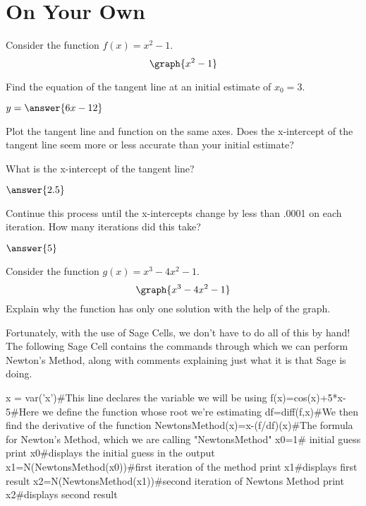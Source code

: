 \documentclass{ximera}
\begin{document}
\section{On Your Own}
\begin{question}
Consider the function $f(x) = x^2-1$.
\[
\graph{x^2-1}
\]

Find the equation of the tangent line at an initial estimate of $x_0=3$.

$y = \answer{6x-12}$

Plot the tangent line and function on the same axes. Does the x-intercept of the tangent line seem more or less accurate than your initial estimate?

\begin{multipleChoice}
\end{multipleChoice}

What is the x-intercept of the tangent line?

$\answer{2.5}$
\begin{onlineOnly}
\begin{sageCell}

\end{sageCell}
\end{onlineOnly}
Continue this process until the x-intercepts change by less than .0001 on each iteration. How many iterations did this take?

$\answer{5}$
\end{question}
\begin{question}
Consider the function $g(x) = x^3-4x^2-1$.
\[
\graph{x^3-4x^2-1}
\]
Explain why the function has only one solution with the help of the graph.

\begin{freeResponse}
\end{freeResponse}
\end{question}

Fortunately, with the use of Sage Cells, we don't have to do all of this by hand! The following Sage Cell contains the commands through which we can perform Newton's Method, along with comments explaining just what it is that Sage is doing.

\begin{onlineOnly}
\begin{sageCell}
x = var('x')#This line declares the variable we will be using
f(x)=cos(x)+5*x-5#Here we define the function whose root we're estimating
df=diff(f,x)#We then find the derivative of the function
NewtonsMethod(x)=x-(f/df)(x)#The formula for Newton's Method, which we are calling "NewtonsMethod"
x0=1# initial guess
print x0#displays the initial guess in the output
x1=N(NewtonsMethod(x0))#first iteration of the method
print x1#displays first result
x2=N(NewtonsMethod(x1))#second iteration of Newtons Method
print x2#displays second result
\end{sageCell}
\end{onlineOnly}
\end{document}

